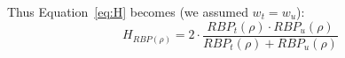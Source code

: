 Thus Equation~\ref{eq:H} becomes (we assumed $w_t = w_u$):
%
\begin{equation}
 H_{RBP(\rho)} = 2 \cdot \frac{RBP_t(\rho) \cdot RBP_u(\rho)}{RBP_t(\rho) + RBP_u(\rho)}
\label{eq:Hrbp}
\end{equation}




